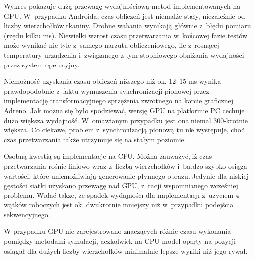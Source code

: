 		Wykres pokazuje dużą przewagę wydajnościową metod implementowanych na GPU. W~przypadku Androida, czas obliczeń jest niemalże stały, niezależnie od liczby wierzchołków tkaniny. Drobne wahania wynikają głównie z~błędu pomiaru (rzędu kilku ms). Niewielki wzrost czasu przetwarzania w~końcowej fazie testów może wynikać nie tyle z~samego narzutu obliczeniowego, ile z~rosnącej temperatury urządzenia i~związanego z tym stopniowego obniżania wydajności przez system operacyjny. 
		
		Niemożność uzyskania czasu obliczeń niższego niż ok. 12--15 ms wynika prawdopodobnie z~faktu wymuszenia synchronizacji pionowej przez implementację transformacyjnego sprzężenia zwrotnego na karcie graficznej Adreno. Jak można się było spodziewać, wersję GPU na platformie PC cechuje dużo większa wydajność. W~omawianym przypadku jest ona niemal 300-krotnie większa. Co ciekawe, problem z~synchronizacją pionową tu nie występuje, choć czas przetwarzania także utrzymuje się na stałym poziomie. 
		
		Osobną kwestią są implementacje na CPU. Można zauważyć, iż czas przetwarzania rośnie liniowo wraz z~liczbą wierzchołków i~bardzo szybko osiąga wartości, które uniemożliwiają generowanie płynnego obrazu. Jedynie dla niskiej gęstości siatki uzyskano przewagę nad GPU, z~racji wspomnianego wcześniej problemu. Widać także, że spadek wydajności dla implementacji z~użyciem 4 wątków roboczych jest ok. dwukrotnie mniejszy niż w~przypadku podejścia sekwencyjnego.
		
		W przypadku GPU nie zarejestrowano znaczących różnic czasu wykonania pomiędzy metodami symulacji, aczkolwiek na CPU model oparty na pozycji osiągał dla dużych liczby wierzchołków minimalnie lepsze wyniki niż jego rywal.
		
		
		
		
		
		
